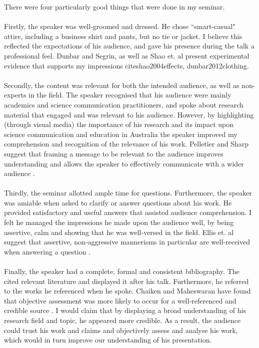There were four particularly good things that were done in my seminar.\\
\\
Firstly, the speaker was well-groomed and dressed.
He chose ``smart-casual" attire, including a business shirt and pants, but no tie or jacket.
I believe this reflected the expectations of his audience, and gave his presence during the talk a
professional feel.
Dunbar and Segrin, as well as Shao et. al present experimental evidence that supports my impressions
cite{shao2004effects, dunbar2012clothing}.\\
\\
Secondly, the content was relevant for both the intended audience, as well as non-experts in the
field.
The speaker recognised that his audience were mainly academics and science communication
practitioners, and spoke about research material that engaged and was relevant to his audience.
However, by highlighting (through visual media) the importance of his research and its impact upon
science communication and education in Australia the speaker improved my comprehension and
recognition of the relevance of his work.
Pelletier and Sharp suggest that framing a message to be relevant to the audience improves
understanding and allows the speaker to effectively communicate with a wider audience \cite{pelletier2008persuasive}.\\
\\
Thirdly, the seminar allotted ample time for questions.
Furthermore, the speaker was amiable when asked to clarify or answer questions about his work.
He provided satisfactory and useful answers that assisted audience comprehension.
I felt he managed the impressions he made upon the audience well, by being assertive, calm and
showing that he was well-versed in the field.
Ellis et. al suggest that assertive, non-aggressive mannerisms in particular are well-received when
answering a question \cite{ellis2002use}.\\
\\
Finally, the speaker had a complete, formal and consistent bibliography.
The cited relevant literature and displayed it after his talk.
Furthermore, he referred to the works he referenced when he spoke.
Chaiken and Maheswaran have found that objective assessment was more likely to occur for a
well-referenced and credible source \cite{chaiken1994heuristic}.
I would claim that by displaying a broad understanding of his research field
and topic, he appeared more credible.
As a result, the audience could trust his work and claims and objectively assess and analyse his
work, which would in turn improve our understanding of his presentation.


